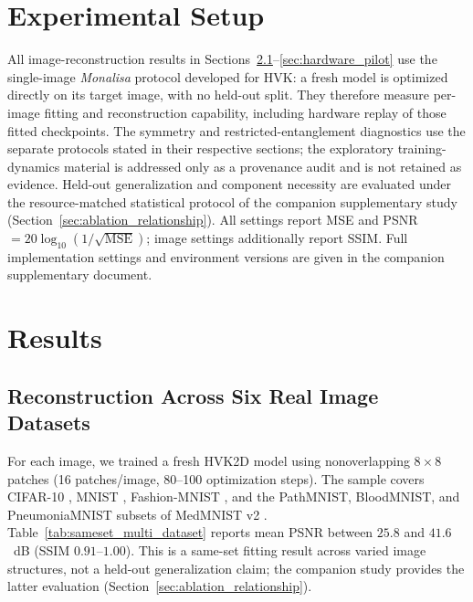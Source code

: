 \documentclass[journal]{IEEEtran}
\begin{document}
\begin{table}[t]
\centering
\caption{HVK variants tested in this paper.}
\label{tab:variants}
\scriptsize
{}
\end{table}

\section{Experimental Setup}
\label{sec:protocol}
All image-reconstruction results in Sections~\ref{sec:sameset_results}--\ref{sec:hardware_pilot} use the single-image \textit{Monalisa} protocol developed for HVK: a fresh model is optimized directly on its target image, with no held-out split. They therefore measure per-image fitting and reconstruction capability, including hardware replay of those fitted checkpoints. The symmetry and restricted-entanglement diagnostics use the separate protocols stated in their respective sections; the exploratory training-dynamics material is addressed only as a provenance audit and is not retained as evidence. Held-out generalization and component necessity are evaluated under the resource-matched statistical protocol of the companion supplementary study (Section~\ref{sec:ablation_relationship}). All settings report MSE and PSNR $=20\log_{10}(1/\sqrt{\mathrm{MSE}})$; image settings additionally report SSIM. Full implementation settings and environment versions are given in the companion supplementary document.

\section{Results}
\label{sec:results}

\subsection{Reconstruction Across Six Real Image Datasets}
\label{sec:sameset_results}
For each image, we trained a fresh HVK2D model using nonoverlapping $8\times8$ patches (16 patches/image, 80--100 optimization steps). The sample covers CIFAR-10 \cite{Krizhevsky2009}, MNIST \cite{LeCun1998}, Fashion-MNIST \cite{Xiao2017}, and the PathMNIST, BloodMNIST, and PneumoniaMNIST subsets of MedMNIST v2 \cite{Yang2023}. Table~\ref{tab:sameset_multi_dataset} reports mean PSNR between $25.8$ and $41.6$~dB (SSIM $0.91$--$1.00$). This is a same-set fitting result across varied image structures, not a held-out generalization claim; the companion study provides the latter evaluation (Section~\ref{sec:ablation_relationship}).
\end{document}
